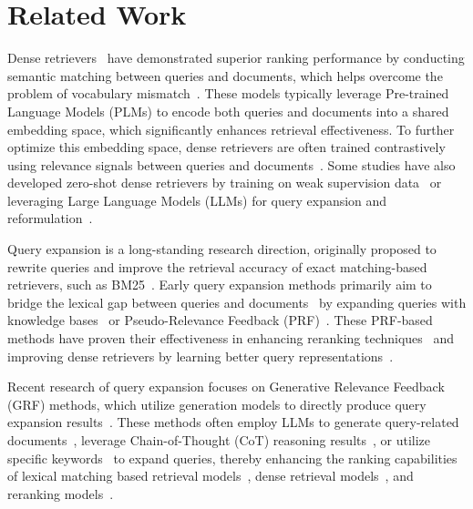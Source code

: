 \section{Related Work}
Dense retrievers~\cite{karpukhin2020dense,xiong2021approximate,izacard2021unsupervised,Yu2021FewShotCD,xiong2021dense,li2021more} have demonstrated superior ranking performance by conducting semantic matching between queries and documents, which helps overcome the problem of vocabulary mismatch~\cite{belkin1982ask}. These models typically leverage Pre-trained Language Models (PLMs) to encode both queries and documents into a shared embedding space, which significantly enhances retrieval effectiveness. To further optimize this embedding space, dense retrievers are often trained contrastively using relevance signals between queries and documents~\cite{karpukhin2020dense,zhan2021optimizing}. Some studies have also developed zero-shot dense retrievers by training on weak supervision data~\cite{xie2023unsupervised} or leveraging Large Language Models (LLMs) for query expansion and reformulation~\cite{gao2022unsupervised}.


Query expansion is a long-standing research direction, originally proposed to rewrite queries and improve the retrieval accuracy of exact matching-based retrievers, such as BM25~\cite{robertson2009probabilistic}. Early query expansion methods primarily aim to bridge the lexical gap between queries and documents~\cite{carpineto2012survey,rocchio1971relevance} by expanding queries with knowledge bases~\cite{bhogal2007review,qiu1993concept,voorhees1994query} or Pseudo-Relevance Feedback (PRF)~\cite{amati2002probabilistic,robertson1990term,rocchio1971relevance}. These PRF-based methods have proven their effectiveness in enhancing reranking techniques~\cite{li2018nprf,ai2018learning,yu2021pgt} and improving dense retrievers by learning better query representations~\cite{yu2021improving}. 


Recent research of query expansion focuses on Generative Relevance Feedback (GRF) methods, which utilize generation models to directly produce query expansion results~\cite{mackie2023generative, claveau2021neural, wang2023generative, jagerman2023query, mackie2023gprf}. These methods often employ LLMs to generate query-related documents~\cite{wang2023query2doc, jagerman2023query, gao2023precise}, leverage Chain-of-Thought (CoT) reasoning results~\cite{wei2022chain, jagerman2023query, trivedi2023interleaving}, or utilize specific keywords~\cite{li2024can, jagerman2023query} to expand queries, thereby enhancing the ranking capabilities of lexical matching based retrieval models~\cite{jagerman2023query, wang2023query2doc}, dense retrieval models~\cite{wang2023query2doc}, and reranking models~\cite{li2024can}.


